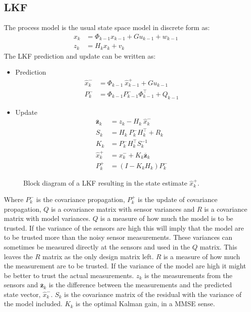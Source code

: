 \subsection{\acl{LKF}}
The process model is the usual state space model in discrete form as:
\begin{align}
x_k &= \Phi_{k-1} x_{k-1} + G u_{k-1} + w_{k-1}\\
z_k &= H_k x_k + v_k
\end{align}
\noindent The \ac{LKF} prediction and update can be written as:
\begin{itemize}\tightlist
\item Prediction
\begin{align}
\hat x_k^- &= \Phi_{k-1}\ \hat x_{k-1}^+ + G u_{k-1} \\
P_k^- &= \Phi_{k-1}P_{k-1}^- \Phi_{k-1}^\top + Q_{k-1}
\end{align}
\item Update
\begin{align}
\bar{\mathbf{z}}_k &= z_k - H_k\ \hat x_k^-\\
S_k &= H_k\ P_k^-H_k^\top + R_k\\
K_k &= P_k^-H_k^\top S_k^{-1}\\
\hat x_k^+ &= x_k^- + K_k \bar{\mathbf{z}}_k\\
P_k^+ &= (I - K_k H_k) P_k^-
\end{align}
\end{itemize}

\begin{figure}
	\centering
	
	\caption{Block diagram of a \acl{LKF} resulting in the state estimate $\hat x_k^+$.}
	\label{fig:blockkf}
\end{figure}

Where $P_{k}^-$ is the covariance propagation, $P_{k}^+$ is the update of covariance propagation, $Q$ is a covariance matrix with sensor variances and $R$ is a covariance matrix with model variances. $Q$ is a measure of how much the model is to be trusted. If the variance of the sensors are high this will imply that the model are to be trusted more than the noisy sensor measurements. These variances can sometimes be measured directly at the sensors and used in the $Q$ matrix. This leaves the $R$ matrix as the only design matrix left. $R$ is a measure of how much the measurement are to be trusted. If the variance of the model are high it might be better to trust the actual measurements. $z_k$ is the measurements from the sensors and $\bar{\mathbf{z}}_k$ is the difference between the measurements and the predicted state vector, $\hat x_k^-$. $S_k$ is the covariance matrix of the residual with the variance of the model included. $K_k$ is the optimal Kalman gain, in a \ac{MMSE} sense. 

